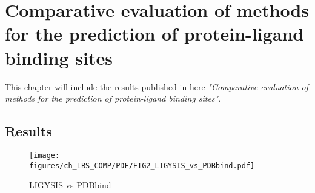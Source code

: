 \chapter{Comparative evaluation of methods for the prediction of protein-ligand binding sites}

This chapter will include the results published in here \textit{"Comparative evaluation of methods for the prediction of protein-ligand binding sites"}.

\section{Results}

\begin{figure}
    \centering
    \texttt{[image: figures/ch\_LBS\_COMP/PDF/FIG2\_LIGYSIS\_vs\_PDBbind.pdf]}
    \caption{LIGYSIS vs PDBbind}
    \label{fig:ligysis_vs_pdbbind}
\end{figure}